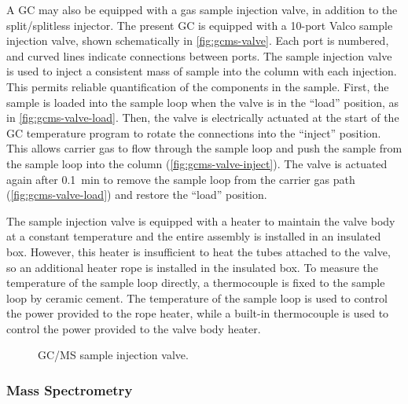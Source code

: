 \documentclass[../main.tex]{subfiles}
\begin{document}
A GC may also be equipped with a gas sample injection valve, in addition to the
split/splitless injector. The present GC is equipped with a 10-port Valco sample
injection valve, shown schematically in \autoref{fig:gcms-valve}.
Each port is numbered, and curved lines indicate connections between ports.
The sample injection valve is used to inject a consistent mass of sample into the column
with each injection. This permits reliable quantification of the
components in the sample. First, the sample is loaded into the sample loop
when the valve is in the ``load'' position, as in \autoref{fig:gcms-valve-load}.
Then, the valve is electrically actuated at the start of the
GC temperature program to rotate the connections into the
``inject'' position. This allows carrier gas to flow through the sample loop and push
the sample from the sample loop into the column (\autoref{fig:gcms-valve-inject}).
 The valve is actuated again after \SI{0.1}{\minute} to remove the sample loop
from the carrier gas path (\autoref{fig:gcms-valve-load}) and restore the ``load'' position.

The sample injection valve is equipped with a heater to maintain
the valve body at a constant temperature and the entire assembly is installed
in an insulated box. However, this heater is insufficient
to heat the tubes attached to the valve, so an additional heater rope is installed
in the insulated box. To measure the temperature of the sample loop directly, a thermocouple
is fixed to the sample loop by ceramic cement. The temperature of the
sample loop is used to control the power provided to the rope heater,
while a built-in thermocouple is used to control the power provided
to the valve body heater.

\begin{figure}
        {\caption{GC/MS sample injection valve.}
        \label{fig:gcms-valve}}
\end{figure}

\subsubsection{Mass Spectrometry}
\end{document}
